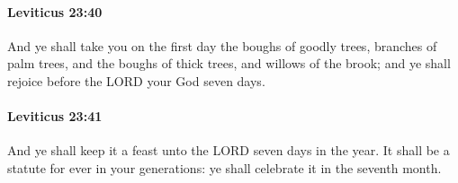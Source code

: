 		\paragraph{Leviticus 23:40} %
			\label{LEVITICUS-23-40}

			And ye shall take you on the first day the boughs of goodly trees, branches of palm trees, and the boughs of thick trees, and willows of the brook; and ye shall rejoice before the LORD your God seven days.


		\paragraph{Leviticus 23:41} %
			\label{LEVITICUS-23-41}

			And ye shall keep it a feast unto the LORD seven days in the year. It shall be a statute for ever in your generations: ye shall celebrate it in the seventh month.

